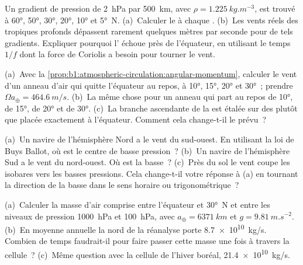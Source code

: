 \begin{exercise}[$\star\star$]\label{exo:b1:atmospheric-circulation:5}
Un gradient de pression de \qty{2}{hPa} par \qty{500}{km}, avec $\rho =
\qty{1.225}{kg.m^{-3}}$, est trouvé à \ang{60}, \ang{50}, \ang{30}, \ang{20},
\ang{10} et \ang{5}~N. (a)~Calculer le  à chaque .
(b)~Les vents réels des tropiques profonds dépassent rarement quelques mètres par seconde pour de tels
gradients. Expliquer pourquoi l' échoue près de l'équateur, en utilisant le
temps $1/f$ dont la force de Coriolis a besoin pour tourner le vent.
\end{exercise}

\begin{exercise}[$\star\star$]\label{exo:b1:atmospheric-circulation:6}
(a)~Avec la \cref{prop:b1:atmospheric-circulation:angular-momentum}, calculer le vent
d'un anneau d'air qui quitte l'équateur au repos, à \ang{10}, \ang{15}, \ang{20} et
\ang{30}~; prendre $\Omega a_\oplus = \qty{464.6}{m/s}$. (b)~La même chose pour un anneau qui
part au repos de \ang{10}, de \ang{15}, de \ang{20} et de \ang{30}. (c)~La branche ascendante
de la  est étalée sur des  plutôt que placée exactement à l'équateur.
Comment cela change-t-il le  prévu~?
\end{exercise}

\begin{exercise}[$\star\star$]\label{exo:b1:atmospheric-circulation:7}
(a)~Un navire de l'hémisphère Nord a le vent du sud-ouest. En utilisant la loi de Buys
Ballot, où est le centre de basse pression~? (b)~Un navire de l'hémisphère
Sud a le vent du nord-ouest. Où est la basse~? (c)~Près du sol le
vent coupe les isobares vers les basses pressions. Cela change-t-il votre réponse à (a)
en tournant la direction de la basse dans le sens horaire ou trigonométrique~?
\end{exercise}

\begin{exercise}[$\star\star$]\label{exo:b1:atmospheric-circulation:8}
(a)~Calculer la masse d'air comprise entre l'équateur et \ang{30}~N et entre les
niveaux de pression \qty{1000}{hPa} et \qty{100}{hPa}, avec $a_\oplus = \qty{6371}{km}$
et $g = \qty{9.81}{m.s^{-2}}$. (b)~En moyenne annuelle la  nord de la
réanalyse porte \qty{8.7e10}{kg/s}. Combien de temps faudrait-il pour faire passer cette masse
une fois à travers la cellule~? (c)~Même question avec la cellule de l'hiver boréal,
\qty{21.4e10}{kg/s}.
\end{exercise}

